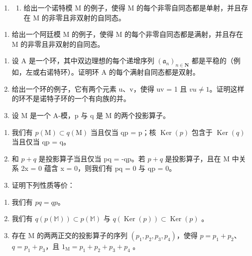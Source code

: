 
\begin{enumerate}
\def\labelenumi{\arabic{enumi})}
\tightlist
\item
  \begin{enumerate}
  \def\labelenumii{\alph{enumii})}
  \tightlist
  \item
    给出一个诺特模 M 的例子，使得 M 的每个非零自同态都是单射，并且存在 M 的非零且非双射的自同态。
  \end{enumerate}
\end{enumerate}

\begin{enumerate}
\def\labelenumi{\alph{enumi})}
\setcounter{enumi}{1}
\tightlist
\item
  给出一个阿廷模 M 的例子，使得 M 的每个非零自同态都是满射，并且存在 M 的非零且非双射的自同态。
\end{enumerate}

\begin{enumerate}
\def\labelenumi{\arabic{enumi})}
\setcounter{enumi}{1}
\item
  设 \(\mathrm{A}\) 是一个环，其中双边理想的每个递增序列 \((\mathfrak{a}_n)_{n\in \mathbf{N}}\) 都是平稳的（例如，左或右诺特环）。证明环 \(\mathrm{A}\) 的每个满射自同态都是双射。
\item
  给出一个环的例子，它有两个元素 u、v，使得 uv = 1 且 \(vu \neq 1\)。证明这样的环不是诺特子环的一个有向族的并。
\item
  设 M 是一个 A-模，p 与 q 是 M 的两个投影算子。
\end{enumerate}

\begin{enumerate}
\def\labelenumi{\alph{enumi})}
\item
  我们有 \(p(\mathrm{M}) \subset q(\mathrm{M})\) 当且仅当 qp = p；核 \(\operatorname{Ker}(p)\) 包含于 \(\operatorname{Ker}(q)\) 当且仅当 qp = q。
\item
  和 \(p + q\) 是投影算子当且仅当 pq = -qp。若 \(p + q\) 是投影算子，且在 M 中关系 2x = 0 蕴含 x = 0，则我们有 pq = 0 与 qp = 0。
\item
  证明下列性质等价：
\end{enumerate}

\begin{enumerate}
\def\labelenumi{(\roman{enumi})}
\item
  我们有 \(pq = qp\)。
\item
  我们有 \(q(p(\mathbb{M})) \subset p(\mathbb{M})\) 与 \(q(\operatorname{Ker}(p)) \subset \operatorname{Ker}(p)\) 。
\item
  存在 M 的两两正交的投影算子的序列 \((p_1, p_2, p_3, p_4)\)，使得 \(p = p_1 + p_2\)、\(q = p_1 + p_3\)，且 \(1_{\mathrm{M}} = p_1 + p_2 + p_3 + p_4\) 。
\end{enumerate}

